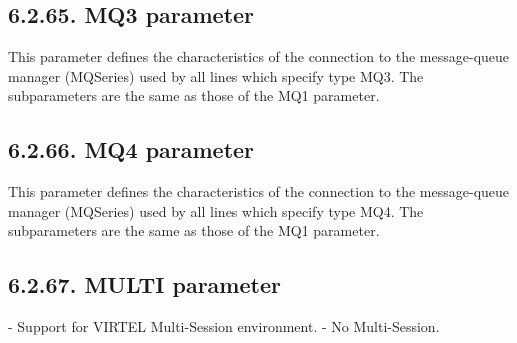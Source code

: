 \documentclass[letterpaper,10pt,english]{sphinxmanual}
\begin{document}
\subsection{6.2.65. MQ3 parameter}
\label{\detokenize{Installation_Guide:mq3-parameter}}
\begin{sphinxVerbatim}[commandchars=\\\{\}]
\PYG{p}{[}\PYG{p}{]}             
\end{sphinxVerbatim}

This parameter defines the characteristics of the connection to the message-queue manager (MQSeries) used by all lines which specify type MQ3. The subparameters are the same as those of the MQ1 parameter.


\subsection{6.2.66. MQ4 parameter}
\label{\detokenize{Installation_Guide:mq4-parameter}}
\begin{sphinxVerbatim}[commandchars=\\\{\}]
\PYG{p}{[}\PYG{p}{]}    
\end{sphinxVerbatim}

This parameter defines the characteristics of the connection to the message-queue manager (MQSeries) used by all lines which specify type MQ4. The subparameters are the same as those of the MQ1 parameter.


\subsection{6.2.67. MULTI parameter}
\label{\detokenize{Installation_Guide:multi-parameter}}
\begin{sphinxVerbatim}[commandchars=\\\{\}]
 
\end{sphinxVerbatim}

 - Support for VIRTEL Multi-Session environment.
 - No Multi-Session.
\end{document}
